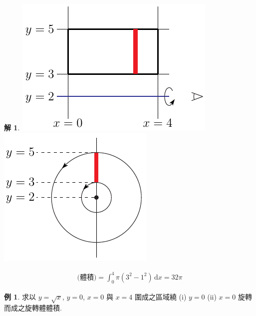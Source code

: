 \documentclass[12pt]{extarticle}
\theoremstyle{definition}
\newtheorem*{ex}{例}
\newtheorem*{sol}{解}
\begin{document}
\begin{sol}
  \begin{minipage}{.6\textwidth}
    \includegraphics[scale=1]{revolveA} 
    \includegraphics[scale=1]{revolveB} 
  \end{minipage}
  \begin{minipage}{.35\textwidth}
    \begin{align*}
      \text{(體積)} = \int_0^4\!\pi(3^2 - 1^2)\,\text{d}x = 32\pi
    \end{align*}
  \end{minipage}
\end{sol}

\begin{ex}
  求以 $y = \sqrt{x}$, $y = 0$, $x = 0$ 與 $x = 4$ 圍成之區域繞 (i) $y = 0$ (ii) $x = 0$ 旋轉而成之旋轉體體積.
\end{ex}
\end{document}

